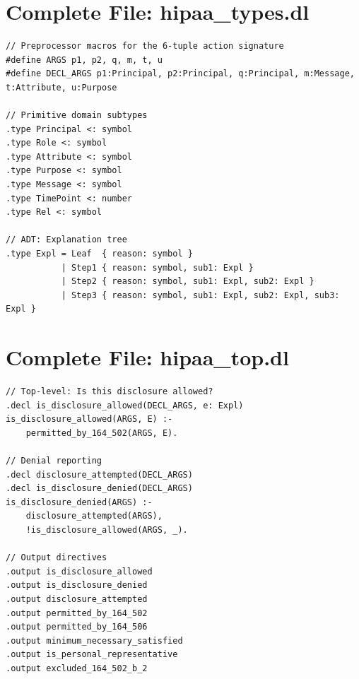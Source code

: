 \documentclass[11pt,letterpaper]{article}
\begin{document}
\begin{appendices}

\section{Complete File: hipaa\_types.dl}
\label{app:types}

\begin{lstlisting}[style=soufflestyle]
// Preprocessor macros for the 6-tuple action signature
#define ARGS p1, p2, q, m, t, u
#define DECL_ARGS p1:Principal, p2:Principal, q:Principal, m:Message, t:Attribute, u:Purpose

// Primitive domain subtypes
.type Principal <: symbol
.type Role <: symbol
.type Attribute <: symbol
.type Purpose <: symbol
.type Message <: symbol
.type TimePoint <: number
.type Rel <: symbol

// ADT: Explanation tree
.type Expl = Leaf  { reason: symbol }
           | Step1 { reason: symbol, sub1: Expl }
           | Step2 { reason: symbol, sub1: Expl, sub2: Expl }
           | Step3 { reason: symbol, sub1: Expl, sub2: Expl, sub3: Expl }
\end{lstlisting}

\section{Complete File: hipaa\_top.dl}
\label{app:top}

\begin{lstlisting}[style=soufflestyle]
// Top-level: Is this disclosure allowed?
.decl is_disclosure_allowed(DECL_ARGS, e: Expl)
is_disclosure_allowed(ARGS, E) :-
    permitted_by_164_502(ARGS, E).

// Denial reporting
.decl disclosure_attempted(DECL_ARGS)
.decl is_disclosure_denied(DECL_ARGS)
is_disclosure_denied(ARGS) :-
    disclosure_attempted(ARGS),
    !is_disclosure_allowed(ARGS, _).

// Output directives
.output is_disclosure_allowed
.output is_disclosure_denied
.output disclosure_attempted
.output permitted_by_164_502
.output permitted_by_164_506
.output minimum_necessary_satisfied
.output is_personal_representative
.output excluded_164_502_b_2
\end{lstlisting}

\end{appendices}
\end{document}

